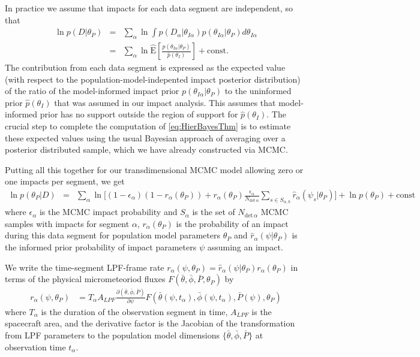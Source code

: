 \documentclass[twocolumn, trackchanges]{aastex62}
\begin{document}
In practice we assume that impacts for each data segment are independent, so that
\begin{eqnarray}
  \ln {p(D|\theta_P)}&=&\sum_\alpha \ln\int {p(D_\alpha|\theta_{I\alpha})}p(\theta_{I\alpha}|\theta_P)d\theta_{I\alpha}\\
  &=&\sum_\alpha \ln\hat{\mathrm{E}}\left[\frac{p(\theta_{I\alpha}|\theta_P)}{\hat p(\theta_I)}\right]+\mathrm{const}\label{eq:metaLikeSegmented}.
\end{eqnarray}
The contribution from each data segment is expressed as the expected value (with respect to the population-model-indepented impact posterior distribution) of the ratio of the model-informed impact prior $p(\theta_{I\alpha}|\theta_P)$ to the uninformed prior $\hat p(\theta_{I})$ that was assumed in our impact analysis.
This assumes that model-informed prior has no support outside the region of support for $\hat p(\theta_{I})$.
The crucial step to complete the computation of \eqref{eq:HierBayesThm} is to estimate these expected values using the usual Bayesian approach of averaging over a posterior distributed sample, which we have already constructed via MCMC.

Putting all this together for our transdimensional MCMC model allowing zero or one impacts per segment, we get
\begin{eqnarray}
  \ln p(\theta_P|D)&=& \sum_\alpha\ln\Big[ (1-\epsilon_\alpha)(1-r_\alpha(\theta_P))+r_\alpha(\theta_P)\frac{\epsilon_\alpha}{N_{\mathrm{det}\,\alpha}}\sum_{s\in S_{\alpha,k}}\hat r_\alpha(\psi_s|\theta_P)\Big]+\ln p(\theta_P)+\mathrm{const}\label{eq:HierPost}
\end{eqnarray}
where $\epsilon_\alpha$ is the MCMC impact probability and $S_{\alpha}$ is the set of $N_{\mathrm{det}\,\alpha}$ MCMC samples with impacts for segment $\alpha$, $r_\alpha(\theta_P)$ is the probability of an impact during this data segment for population model parameters $\theta_P$ and $\hat r_\alpha(\psi|\theta_P)$ is the informed prior probability of impact parameters $\psi$ assuming an impact.

 We write the time-segment LPF-frame rate $r_\alpha(\psi,\theta_P)=\hat r_\alpha(\psi|\theta_P)r_\alpha(\theta_P)$ in terms of the physical micrometeoriod fluxes $F(\bar\theta,\bar\phi,\bar P,\theta_P)$ by
\begin{align}
  r_\alpha(\psi,\theta_P)&=T_\alpha A_{LPF}\frac{\partial(\bar\theta,\bar\phi,\bar P)}{\partial\psi}F(\bar\theta(\psi,t_\alpha),\bar\phi(\psi,t_\alpha),\bar P(\psi),\theta_P)
\end{align}
where $T_\alpha$ is the duration of the observation segment in time, $A_{LPF}$ is the spacecraft area, and the derivative factor is the Jacobian of the transformation from LPF parameters to the population model dimensions $\{\bar\theta,\bar\phi,\bar P\}$ at observation time $t_\alpha$.
\end{document}

